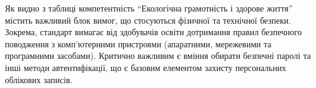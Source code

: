 \begin{longtable}{|m{}|p{}|p{}|}



\end{longtable}

Як видно з таблиці компетентність ``Екологічна грамотність і здорове життя'' містить важливий блок вимог, що стосуються фізичної та технічної безпеки. Зокрема, стандарт вимагає від здобувачів освіти дотримання правил безпечного поводження з комп’ютерними пристроями (апаратними, мережевими та програмними засобами). Критично важливим є вміння обирати безпечні паролі та інші методи автентифікації, що є базовим елементом захисту персональних облікових записів.

